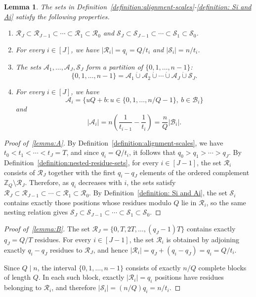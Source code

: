 \documentclass[journal,letterpaper,onecolumn,11pt]{IEEEtran}
\newcommand{\bZ}{\mathbb{Z}}
\newcommand{\cA}{\mathcal{A}}
\newcommand{\cB}{\mathcal{B}}
\newcommand{\cR}{\mathcal{R}}
\newcommand{\cS}{\mathcal{S}}
\newtheorem{lemma}{Lemma}
\begin{document}
\begin{lemma}\label{lemma:periodic-coordinate-properties}
The sets in Definition~\ref{definition:alignment-scales}-\ref{definition: Si and Ai} satisfy the following properties.
\begin{enumerate}
    \renewcommand{\labelenumi}{(\Alph{enumi})}
    \renewcommand{\theenumi}{(\Alph{enumi})}

    \item\label{lemma:A} $\cR_J\subset\cR_{J-1}\subset\cdots\subset\cR_1\subset\cR_0$ and
    $\cS_J\subset\cS_{J-1}\subset\cdots\subset\cS_1\subset\cS_0$.
    
    \item\label{lemma:B} For every $i\in[J]$, we have
    $|\cR_i|=q_i=Q/t_i$ and $|\cS_i|=n/t_i$.
    
    \item\label{lemma:C} The sets $\cA_1,\ldots,\cA_J,\cS_J$ form a partition of
    $\{0,1,\ldots,n-1\}$:
    \[
    \{0,1,\ldots,n-1\}
    =\cA_1\mathbin{\dot\cup}\cA_2\mathbin{\dot\cup}\cdots
    \mathbin{\dot\cup}\cA_J\mathbin{\dot\cup}\cS_J.
    \]
    
    \item\label{lemma:D} For every $i\in[J]$, we have
    \[
    \cA_i=\{uQ+b:u\in\{0,1,\ldots,n/Q-1\},\ b\in\cB_i\}
    \]
    and
    \[
    |\cA_i|
    =n\left(\frac{1}{t_{i-1}}-\frac{1}{t_i}\right)
    =\frac{n}{Q}|\cB_i|.
    \]
\end{enumerate}
\end{lemma}

\begin{proof}[Proof of~\ref{lemma:A}]
By Definition~\ref{definition:alignment-scales}, we have
\(t_0<t_1<\cdots<t_J=T\), and since \(q_i=Q/t_i\), it follows that
\(q_0>q_1>\cdots>q_J\). By
Definition~\ref{definition:nested-residue-sets}, for every
\(i\in[J-1]\), the set \(\cR_i\) consists of \(\cR_J\) together with the
first \(q_i-q_J\) elements of the ordered complement
\(\bZ_Q\setminus\cR_J\). Therefore, as \(q_i\) decreases with \(i\), the
sets satisfy
\(\cR_J\subset\cR_{J-1}\subset\cdots\subset\cR_1\subset\cR_0\).
By Definition~\ref{definition: Si and Ai}, the set \(\cS_i\) contains
exactly those positions whose residues modulo \(Q\) lie in \(\cR_i\), so
the same nesting relation gives
\(\cS_J\subset\cS_{J-1}\subset\cdots\subset\cS_1\subset\cS_0\).
\end{proof}

\begin{proof}[Proof of~\ref{lemma:B}]
The set \(\cR_J=\{0,T,2T,\ldots,(q_J-1)T\}\) contains exactly
\(q_J=Q/T\) residues. For every \(i\in[J-1]\), the set \(\cR_i\) is
obtained by adjoining exactly \(q_i-q_J\) residues to \(\cR_J\), and hence
\(|\cR_i|=q_J+(q_i-q_J)=q_i=Q/t_i\).

Since \(Q\mid n\), the interval \(\{0,1,\ldots,n-1\}\) consists of exactly
\(n/Q\) complete blocks of length \(Q\). In each such block, exactly
\(|\cR_i|=q_i\) positions have residues belonging to \(\cR_i\), and
therefore \(|\cS_i|=(n/Q)q_i=n/t_i\). 
\end{proof}
\end{document}
